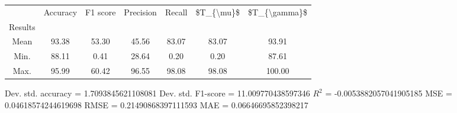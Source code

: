 \begin{tabular}{|c|c|c|c|c|c|c|}
\toprule
{} &  Accuracy &  F1 score &  Precision &  Recall &  \$T\_\{\textbackslash mu\}\$ &  \$T\_\{\textbackslash gamma\}\$ \\
Results &           &           &            &         &            &               \\
\hline
Mean    &     93.38 &     53.30 &      45.56 &   83.07 &      83.07 &         93.91 \\
Min.    &     88.11 &      0.41 &      28.64 &    0.20 &       0.20 &         87.61 \\
Max.    &     95.99 &     60.42 &      96.55 &   98.08 &      98.08 &        100.00 \\
\bottomrule
\end{tabular}

 Dev. std. accuracy = 1.7093845621108081
 Dev. std. F1-score = 11.009770438597346
 $R^2$ = -0.0053882057041905185
 MSE = 0.04618574244619698
 RMSE = 0.21490868397111593
 MAE = 0.06646695852398217